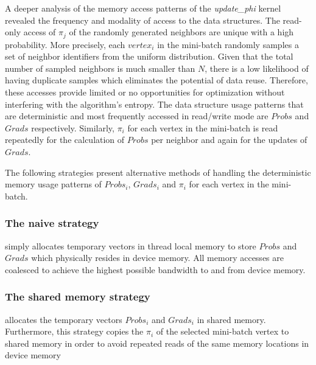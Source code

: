 A deeper analysis of the memory access patterns of the \textit{update\_phi} kernel
revealed the frequency and modality of access to the data structures.
%
The read-only access of $\pi_j$ of the randomly generated neighbors are unique
with a high probability. More precisely, each $vertex_i$ in the mini-batch
randomly samples a set of neighbor identifiers from the uniform distribution.
Given that the total number of sampled neighbors is much smaller than $N$,
there is a low likelihood of having duplicate samples which eliminates the
potential of data reuse. Therefore, these accesses provide limited or no
opportunities for optimization without interfering with the algorithm's
entropy.
%
The data structure usage patterns that are deterministic and most frequently
accessed in read/write mode are $Probs$ and $Grads$ respectively. Similarly,
$\pi_i$ for each vertex in the mini-batch is read repeatedly for the
calculation of $Probs$ per neighbor and again for the updates of $Grads$.

The following strategies present alternative methods of handling the
deterministic memory usage patterns of $Probs_i$, $Grads_i$ and $\pi_i$ for each
vertex in the mini-batch.

\subsubsection*{The naive strategy} simply allocates temporary vectors in thread
local memory to store $Probs$ and $Grads$ which physically resides in
device memory. All memory accesses are coalesced to achieve the highest
possible bandwidth to and from device memory.

\subsubsection*{The shared memory strategy} allocates the temporary vectors
$Probs_i$ and $Grads_i$
in shared memory. Furthermore, this strategy copies the $\pi_i$ of the selected
mini-batch vertex to shared memory in order to avoid repeated reads of the same
memory locations in device memory


